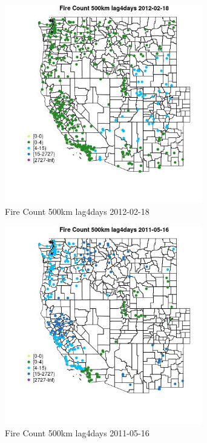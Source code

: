 \begin{figure} 
\centering  
\includegraphics[width=0.77\textwidth]{Code_Outputs/Report_ML_input_PM25_Step4_part_f_de_duplicated_aves_prioritize_24hr_obswNAs_MapObsFire_Count_500km_lag4days2012-02-18.jpg} 
\caption{\label{fig:Report_ML_input_PM25_Step4_part_f_de_duplicated_aves_prioritize_24hr_obswNAsMapObsFire_Count_500km_lag4days2012-02-18}Fire Count 500km lag4days 2012-02-18} 
\end{figure} 
 

\begin{figure} 
\centering  
\includegraphics[width=0.77\textwidth]{Code_Outputs/Report_ML_input_PM25_Step4_part_f_de_duplicated_aves_prioritize_24hr_obswNAs_MapObsFire_Count_500km_lag4days2011-05-16.jpg} 
\caption{\label{fig:Report_ML_input_PM25_Step4_part_f_de_duplicated_aves_prioritize_24hr_obswNAsMapObsFire_Count_500km_lag4days2011-05-16}Fire Count 500km lag4days 2011-05-16} 
\end{figure} 
 

